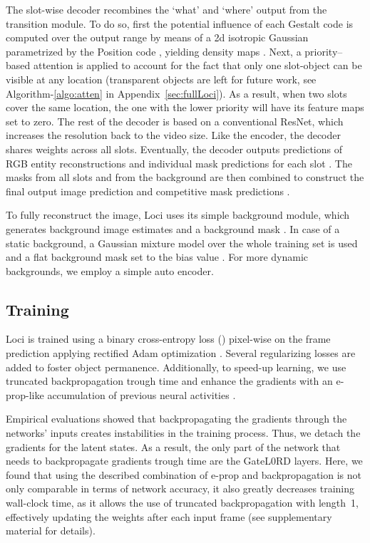 \documentclass{article} \usepackage{iclr2023_conference_arxiv,times}
\begin{document}
The slot-wise decoder recombines the `what' and `where' output from the transition module.
To do so, first the potential influence of each Gestalt code  is computed over the output range by means of a 2d isotropic Gaussian parametrized by the Position code , yielding density maps .
Next, a priority--based attention is applied to account for the fact that only one slot-object can be visible at any location (transparent objects are left for future work,
see Algorithm-\ref{algo:atten} in Appendix~\ref{sec:fullLoci}).
As a result, when two slots cover the same location, the one with the lower priority will have its feature maps set to zero.
The rest of the decoder is based on a conventional ResNet, which increases the resolution back to the video size. 
Like the encoder, the decoder shares weights across all slots. 
Eventually, the decoder outputs predictions of RGB entity reconstructions  and individual mask predictions  for each slot .
The masks from all slots and from the background are then combined to construct the final output image prediction  and competitive mask predictions .

To fully reconstruct the image, Loci uses its simple background module, which generates background image estimates  and a background mask . 
In case of a static background, a Gaussian mixture model over the whole training set is used and a flat background mask set to the bias value  .
For more dynamic backgrounds, we employ a simple auto encoder.





\subsection{Training}

Loci is trained using a binary cross-entropy loss () pixel-wise on the frame prediction applying rectified Adam optimization \cite[RAdam, cf.][]{liu2019variance}. 
Several regularizing losses are added to foster object permanence. 
Additionally, to speed-up learning, we use truncated backpropagation trough time and enhance the gradients with an e-prop-like accumulation of previous neural activities \cite{bellec2019biologically}. 

Empirical evaluations showed that backpropagating the gradients through the networks' inputs creates instabilities in the training process. 
Thus, we detach the gradients for the latent states.
As a result, the only part of the network that needs to backpropagate gradients trough time are the GateL0RD layers. 
Here, we found that using the described combination of e-prop and backpropagation is not only comparable in terms of network accuracy, it also greatly decreases training wall-clock time, as it allows the use of truncated backpropagation with length~1, effectively updating the weights after each input frame (see supplementary material for details).
\end{document}

